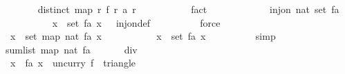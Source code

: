 \begin{isabellebody}
\ \ \ \ \ \ \isamarkupfalse%
\ {\isachardoublequoteopen}distinct\ {\isacharparenleft}map\ {\isacharparenleft}{\isasymlambda}r{\isachardot}\ f\ r\ {\isacharparenleft}a\ r{\isacharparenright}{\isacharparenright}\ {\isacharbrackleft}{}{\isachardot}{\isachardot}{\isacharless}{}{}{}{}{\isacharbrackright}{\isacharparenright}{\isachardoublequoteclose}\isanewline
\ \ \ \ \ \ \ \ \isamarkupfalse%
\ fact\isanewline
\ \ \ \ \isamarkupfalse%
\isanewline
\ \ \ \ \ \ \isamarkupfalse%
\ {\isachardoublequoteopen}inj{\isacharunderscore}on\ nat\ {\isacharparenleft}set\ {\isacharquery}fa{\isacharparenright}{\isachardoublequoteclose}\isanewline
\ \ \ \ \ \ \ \ \isamarkupfalse%
\ {\isacharbackquoteopen}{\isasymforall}\ x\ {\isasymin}\ set\ {\isacharquery}fa{\isachardot}\ x\ {\isachargreater}\ {}{\isacharbackquoteclose}\ inj{\isacharunderscore}on{\isacharunderscore}def\isanewline
\ \ \ \ \ \ \ \ \isamarkupfalse%
\ force\isanewline
\ \ \ \ \isamarkupfalse%
\isanewline
\ \ \isamarkupfalse%
\isanewline
\ \ \ \ \isamarkupfalse%
\ {\isachardoublequoteopen}{\isasymforall}\ x\ {\isasymin}\ set\ {\isacharparenleft}map\ nat\ {\isacharquery}fa{\isacharparenright}{\isachardot}\ x\ {\isachargreater}\ {}{\isachardoublequoteclose}\isanewline
\ \ \ \ \ \ \isamarkupfalse%
\ {\isacharbackquoteopen}{\isasymforall}\ x\ {\isasymin}\ set\ {\isacharquery}fa{\isachardot}\ x\ {\isachargreater}\ {}{\isacharbackquoteclose}\isanewline
\ \ \ \ \ \ \isamarkupfalse%
\ simp\isanewline
\ \ \isamarkupfalse%
\isanewline
\ \ \ \ \isamarkupfalse%
\ {\isachardoublequoteopen}sum{\isacharunderscore}list\ {\isacharparenleft}map\ nat\ {\isacharquery}fa{\isacharparenright}\ {\isasymle}\ {}{}{}{}\ {\isacharasterisk}\ {\isacharparenleft}{}{}{}{}\ {\isacharplus}\ {}{\isacharparenright}\ div\ {}{\isachardoublequoteclose}\isanewline
\ \ \ \ \isamarkupfalse%
{\isacharminus}\isanewline
\ \ \ \ \ \ \isamarkupfalse%
\ {\isachardoublequoteopen}{\isacharparenleft}{\isasymSum}\ x\ {\isasymleftarrow}\ {\isacharquery}fa{\isachardot}\ x{\isacharparenright}\ {\isasymin}\ {\isacharparenleft}uncurry\ f{\isacharparenright}\ {\isacharbackquote}\ {\isacharparenleft}triangle\ {}\ {}\ {}{}{}{}{\isacharparenright}{\isachardoublequoteclose}\isanewline

\end{isabellebody}
